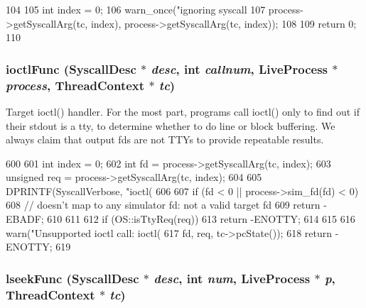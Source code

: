 \begin{DoxyCode}
104 {
105     int index = 0;
106     warn_once("ignoring syscall %
107          process->getSyscallArg(tc, index), process->getSyscallArg(tc, index));
108 
109     return 0;
110 }
\end{DoxyCode}
\hypertarget{syscall__emul_8hh_af6b366bfb30ebd76fe4647b2c29c94cf}{
\subsubsection[{ioctlFunc}]{ ioctlFunc ({\bf SyscallDesc} $\ast$ {\em desc}, \/  int {\em callnum}, \/  {\bf LiveProcess} $\ast$ {\em process}, \/  {\bf ThreadContext} $\ast$ {\em tc})}}
\label{syscall__emul_8hh_af6b366bfb30ebd76fe4647b2c29c94cf}
Target ioctl() handler. For the most part, programs call ioctl() only to find out if their stdout is a tty, to determine whether to do line or block buffering. We always claim that output fds are not TTYs to provide repeatable results. 


\begin{DoxyCode}
600 {
601     int index = 0;
602     int fd = process->getSyscallArg(tc, index);
603     unsigned req = process->getSyscallArg(tc, index);
604 
605     DPRINTF(SyscallVerbose, "ioctl(%
606 
607     if (fd < 0 || process->sim_fd(fd) < 0) {
608         // doesn't map to any simulator fd: not a valid target fd
609         return -EBADF;
610     }
611 
612     if (OS::isTtyReq(req)) {
613         return -ENOTTY;
614     }
615 
616     warn("Unsupported ioctl call: ioctl(%
617          fd, req, tc->pcState());
618     return -ENOTTY;
619 }
\end{DoxyCode}
\hypertarget{syscall__emul_8hh_aa37fa875550097f17e97de14c6964464}{
\subsubsection[{lseekFunc}]{ lseekFunc ({\bf SyscallDesc} $\ast$ {\em desc}, \/  int {\em num}, \/  {\bf LiveProcess} $\ast$ {\em p}, \/  {\bf ThreadContext} $\ast$ {\em tc})}}
\label{syscall__emul_8hh_aa37fa875550097f17e97de14c6964464}


